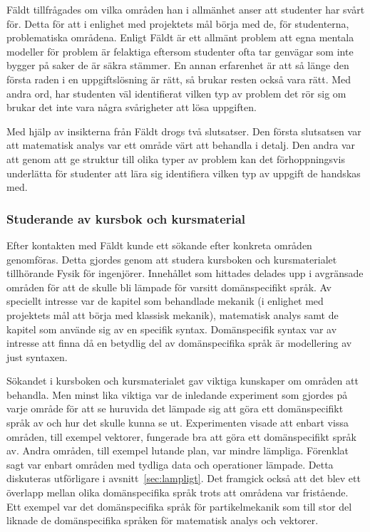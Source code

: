 Fäldt tillfrågades om vilka områden han i allmänhet anser att studenter har
svårt för. Detta för att i enlighet med projektets mål börja med de, för
studenterna, problematiska områdena. Enligt Fäldt är ett allmänt problem att
egna mentala modeller för problem är felaktiga eftersom studenter ofta tar
genvägar som inte bygger på saker de är säkra stämmer. En annan erfarenhet
är att så länge den första raden i en uppgiftslösning är rätt, så brukar
resten också vara rätt. Med andra ord, har studenten väl identifierat vilken typ av
problem det rör sig om brukar det inte vara några svårigheter att lösa
uppgiften.

Med hjälp av insikterna från Fäldt drogs två slutsatser. Den första slutsatsen
var att matematisk analys var ett område värt att behandla i detalj. Den andra
var att genom att ge struktur till olika typer av problem kan det
förhoppningsvis underlätta för studenter att lära sig identifiera vilken
typ av uppgift de handskas med.

\subsubsection*{Studerande av kursbok och kursmaterial}

Efter kontakten med Fäldt kunde ett sökande efter konkreta områden genomföras.
Detta gjordes genom att studera kursboken och kursmaterialet tillhörande Fysik
för ingenjörer. Innehållet som hittades delades upp i avgränsade områden för att
de skulle bli lämpade för varsitt domänspecifikt språk. Av speciellt intresse
var de kapitel som behandlade mekanik (i enlighet med projektets mål att börja
med klassisk mekanik), matematisk analys samt de kapitel som använde sig av en
specifik syntax. Domänspecifik syntax var av intresse att finna
då en betydlig del av domänspecifika språk är modellering av just syntaxen.

Sökandet i kursboken och kursmaterialet gav viktiga kunskaper om områden att
behandla. Men minst lika viktiga var de inledande experiment som gjordes på
varje område för att se huruvida det lämpade sig att göra ett domänspecifikt
språk av och hur det skulle kunna se ut. Experimenten visade att enbart vissa
områden, till exempel vektorer, fungerade bra att göra ett domänspecifikt språk
av. Andra områden, till exempel lutande plan, var mindre lämpliga. Förenklat
sagt var enbart områden med tydliga data och operationer lämpade. Detta
diskuteras utförligare i avsnitt~\ref{sec:lampligt}. Det framgick också att det
blev ett överlapp mellan olika domänspecifika språk trots att områdena var fristående.
Ett exempel var det domänspecifika språk för partikelmekanik som till stor del
liknade de domänspecifika språken för matematisk analys och vektorer.

